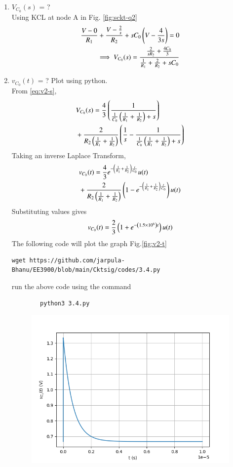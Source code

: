 \documentclass[journal,12pt,twocolumn]{IEEEtran}
\renewcommand\thesection{\arabic{section}}
\begin{document}
\begin{enumerate}[label=\arabic*.,ref=\thesection.\theenumi]
		\item $V_{C_0}(s)$ = ?  \\
        \solution Using KCL at node A in Fig. \ref{fig:sckt-q2}
\begin{align}
    \frac{V - 0}{R_1} + \frac{V - \frac{2}{s}}{R_2} + sC_0\left(V - \frac{4}{3s}\right) = 0 \\
\implies V_{C_0}(s) = \frac{\frac{2}{sR_2} + \frac{4C_0}{3}}{\frac{1}{R_1} + \frac{2}{R_2} + sC_0}
\label{eq:v2-s}
\end{align}
	\item $v_{C_0}(t)$ = ? Plot using python.\\
	\solution From \eqref{eq:v2-s},
    \begin{align}
        &V_{C_0}(s) = \frac{4}{3}\left(\frac{1}{\frac{1}{C_0}\left(\frac{1}{R_1} + \frac{1}{R_2}\right)+s}\right) \nonumber \\
        &+ \frac{2}{R_2\left(\frac{1}{R_1} +\frac{1}{R_2}\right)}\left(\frac{1}{s} - \frac{1}{\frac{1}{C_0}\left(\frac{1}{R_1} + \frac{1}{R_2}\right) + s}\right)
    \end{align}
    Taking an inverse Laplace Transform,
    \begin{align}
        &v_{C_0}(t) = \frac{4}{3}e^{-\left(\frac{1}{R_1} + \frac{1}{R_2}\right)\frac{t}{C_0}}u(t) \nonumber \\ 
        &+ \frac{2}{R_2\left(\frac{1}{R_1}+\frac{1}{R_2}\right)}\left(1 - e^{-\left(\frac{1}{R_1} + \frac{1}{R_2}\right)\frac{t}{C_0}}\right)u(t)
    \end{align}
    Substituting values gives
    \begin{align}
        v_{C_0}(t) = \frac{2}{3}\left(1 +e^{-\left(1.5 \times 10^6\right)t}\right)u(t)
        \label{eq:v2-t}
    \end{align}
    The following code will plot the graph Fig.\eqref{fig:v2-t}
    \begin{lstlisting}
wget https://github.com/jarpula-Bhanu/EE3900/blob/main/Cktsig/codes/3.4.py
    \end{lstlisting}
        run the above code using the command
        \begin{lstlisting}
        python3 3.4.py
        \end{lstlisting}
    \begin{figure}[!ht]
        \includegraphics[width=\columnwidth]{./figs/3.4.png}

\end{figure}
\end{enumerate}
\end{document}
